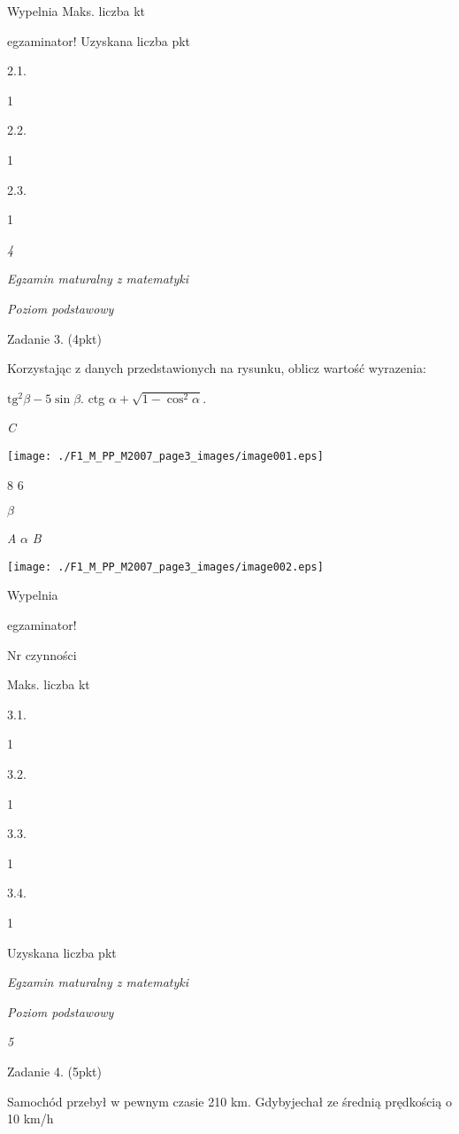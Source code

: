 \documentclass[a4paper,12pt]{article}
\begin{document}
Wypelnia Maks. liczba kt

egzaminator! Uzyskana liczba pkt

2.1.

1

2.2.

1

2.3.

1





{\it 4}

{\it Egzamin maturalny z matematyki}

{\it Poziom podstawowy}

Zadanie 3. (4pkt)

Korzystając z danych przedstawionych na rysunku, oblicz wartość wyrazenia:

$\mathrm{t}\mathrm{g}^{2}\beta-5\sin\beta$. ctg $\alpha+\sqrt{1-\cos^{2}\alpha}.$

{\it C}
\begin{center}
\texttt{[image: ./F1\_M\_PP\_M2007\_page3\_images/image001.eps]}
\end{center}
8  6

$\beta$

{\it A}  $\alpha$  {\it B}
\begin{center}
\texttt{[image: ./F1\_M\_PP\_M2007\_page3\_images/image002.eps]}
\end{center}
Wypelnia

egzaminator!

Nr czynności

Maks. liczba kt

3.1.

1

3.2.

1

3.3.

1

3.4.

1

Uzyskana liczba pkt





{\it Egzamin maturalny z matematyki}

{\it Poziom podstawowy}

{\it 5}

Zadanie 4. (5pkt)

Samochód przebył w pewnym czasie 210 km. Gdybyjechał ze średnią prędkością o 10 km/h
\end{document}

